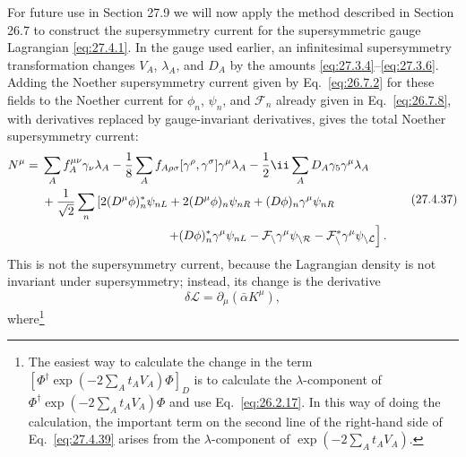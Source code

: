 For future use in Section 27.9 we will now apply the method described in
Section 26.7 to construct the supersymmetry current for the supersymmetric
gauge Lagrangian \eqref{eq:27.4.1}. In the gauge used earlier, an
infinitesimal supersymmetry transformation changes \(V_A\), \(\lambda_A\),
and \(D_A\) by the amounts \eqref{eq:27.3.4}--\eqref{eq:27.3.6}. Adding the
Noether supersymmetry current given by Eq.~\eqref{eq:26.7.2} for these fields
to the Noether current for \(\phi_n\), \(\psi_n\), and \(\mathcal{F}_n\)
already given in Eq.~\eqref{eq:26.7.8}, with derivatives replaced by
gauge-invariant derivatives, gives the total Noether supersymmetry current:
\begin{equation}
  \begin{aligned}
  N^\mu={}&
  \sum_Af_A^{\mu\nu}\gamma_\nu\lambda_A
  -\frac18\sum_Af_{A\rho\sigma}
    [\gamma^\rho,\gamma^\sigma]\gamma^\mu\lambda_A
  -\frac12\ii\sum_AD_A\gamma_5\gamma^\mu\lambda_A
  \\
  &+\frac1{\sqrt{2}}\sum_n\left[
    2(D^\mu\phi)_n^*\psi_{nL}
    +2(D^\mu\phi)_n\psi_{nR}
    +(\sl{D}\phi)_n\gamma^\mu\psi_{nR}
  \right.
  \\
  &\hspace{36mm}\left.
    +(\sl{D}\phi)_n^*\gamma^\mu\psi_{nL}
    -\mathcal{F}_n\gamma^\mu\psi_{nR}
    -\mathcal{F}_n^*\gamma^\mu\psi_{nL}
  \right].
  \end{aligned}
  \tag{27.4.37}\label{eq:27.4.37}
\end{equation}
This is not the supersymmetry current, because the Lagrangian density is not
invariant under supersymmetry; instead, its change is the derivative
\begin{equation}
  \delta\mathcal{L}=\partial_\mu\left(\bar\alpha K^\mu\right),
  \tag{27.4.38}\label{eq:27.4.38}
\end{equation}
where\footnote{The easiest way to calculate the change in the term
\(\left[\Phi^\dagger\exp(-2\sum_A t_AV_A)\Phi\right]_D\) is to calculate the
\(\lambda\)-component of
\(\Phi^\dagger\exp(-2\sum_A t_AV_A)\Phi\) and use
Eq.~\eqref{eq:26.2.17}. In this way of doing the calculation, the important
term on the second line of the right-hand side of Eq.~\eqref{eq:27.4.39}
arises from the \(\lambda\)-component of
\(\exp(-2\sum_A t_AV_A)\).}
